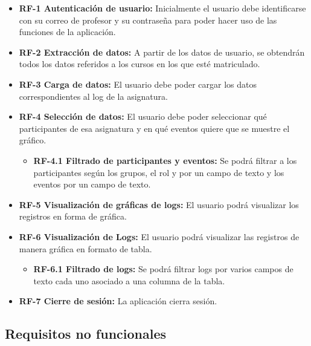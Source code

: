 \begin{itemize}
	\tightlist
	\item
	\textbf{RF-1 Autenticación de usuario:} Inicialmente el usuario debe identificarse con su correo de profesor y su contraseña para poder hacer uso de las funciones de la aplicación.
	\item
	\textbf{RF-2 Extracción de datos:} A partir de los datos de usuario, se obtendrán todos los datos referidos a los cursos en los que esté matriculado.
	\item
	\textbf{RF-3 Carga de datos:} El usuario debe poder cargar los datos correspondientes al log de la asignatura.
	\item
	\textbf{RF-4 Selección de datos:} El usuario debe poder seleccionar qué participantes de esa asignatura y en qué eventos quiere que se muestre el gráfico.
	
	\begin{itemize}
		\tightlist
		\item
		\textbf{RF-4.1 Filtrado de participantes y eventos:} Se podrá filtrar a los participantes según los grupos, el rol y por un campo de texto y los eventos por un campo de texto.
	\end{itemize}
	\item
	\textbf{RF-5 Visualización de gráficas de logs:} El usuario podrá visualizar los registros en forma de gráfica.
	\item
	\textbf{RF-6 Visualización de Logs:} El usuario podrá visualizar las registros de manera gráfica en formato de tabla.
		\begin{itemize}
			\tightlist
			\item
			\textbf{RF-6.1 Filtrado de logs:} Se podrá filtrar logs por varios campos de texto cada uno asociado a una columna de la tabla.
		\end{itemize}
	\item
	\textbf{RF-7 Cierre de sesión:} La aplicación cierra sesión.
\end{itemize}

\subsection{Requisitos no funcionales}\label{requisitos-no-funcionales}

